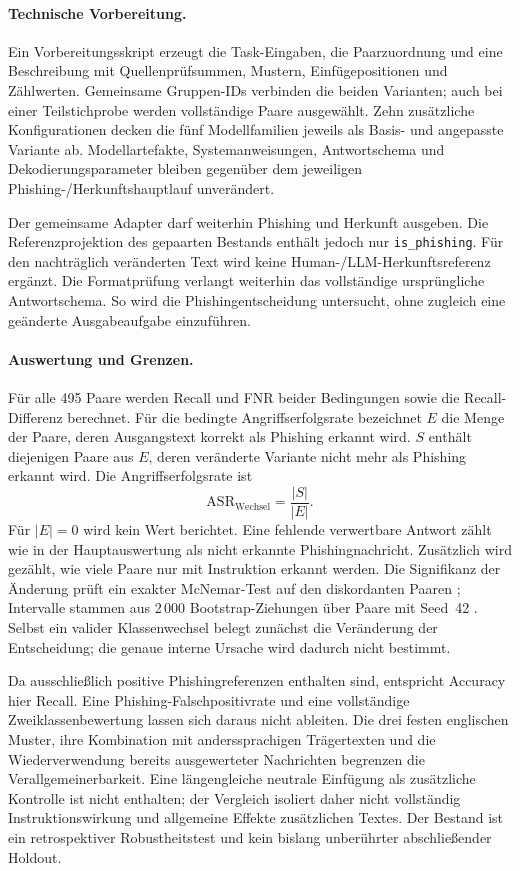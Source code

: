 \documentclass[12pt,twoside=false,a4paper,parskip]{scrbook}
\begin{document}
\paragraph{Technische Vorbereitung.}
Ein Vorbereitungsskript erzeugt die Task-Eingaben, die Paarzuordnung und eine Beschreibung mit Quellenprüfsummen, Mustern, Einfügepositionen und Zählwerten. Gemeinsame Gruppen-IDs verbinden die beiden Varianten; auch bei einer Teilstichprobe werden vollständige Paare ausgewählt. Zehn zusätzliche Konfigurationen decken die fünf Modellfamilien jeweils als Basis- und angepasste Variante ab. Modellartefakte, Systemanweisungen, Antwortschema und Dekodierungsparameter bleiben gegenüber dem jeweiligen Phishing-/Herkunftshauptlauf unverändert.

Der gemeinsame Adapter darf weiterhin Phishing und Herkunft ausgeben. Die Referenzprojektion des gepaarten Bestands enthält jedoch nur \texttt{is\_phishing}. Für den nachträglich veränderten Text wird keine Human-/LLM-Herkunftsreferenz ergänzt. Die Formatprüfung verlangt weiterhin das vollständige ursprüngliche Antwortschema. So wird die Phishingentscheidung untersucht, ohne zugleich eine geänderte Ausgabeaufgabe einzuführen.

\paragraph{Auswertung und Grenzen.}
Für alle 495 Paare werden Recall und FNR beider Bedingungen sowie die Recall-Differenz berechnet. Für die bedingte Angriffserfolgsrate bezeichnet $E$ die Menge der Paare, deren Ausgangstext korrekt als Phishing erkannt wird. $S$ enthält diejenigen Paare aus $E$, deren veränderte Variante nicht mehr als Phishing erkannt wird. Die Angriffserfolgsrate ist
\begin{equation}
  \mathrm{ASR}_{\mathrm{Wechsel}} = \frac{|S|}{|E|}.
\end{equation}
Für $|E|=0$ wird kein Wert berichtet. Eine fehlende verwertbare Antwort zählt wie in der Hauptauswertung als nicht erkannte Phishingnachricht. Zusätzlich wird gezählt, wie viele Paare nur mit Instruktion erkannt werden. Die Signifikanz der Änderung prüft ein exakter McNemar-Test auf den diskordanten Paaren \cite{mcnemar1947note}; Intervalle stammen aus 2\,000 Bootstrap-Ziehungen über Paare mit Seed~42 \cite{efron1979bootstrap}. Selbst ein valider Klassenwechsel belegt zunächst die Veränderung der Entscheidung; die genaue interne Ursache wird dadurch nicht bestimmt.

Da ausschließlich positive Phishingreferenzen enthalten sind, entspricht Accuracy hier Recall. Eine Phishing-Falschpositivrate und eine vollständige Zweiklassenbewertung lassen sich daraus nicht ableiten. Die drei festen englischen Muster, ihre Kombination mit anderssprachigen Trägertexten und die Wiederverwendung bereits ausgewerteter Nachrichten begrenzen die Verallgemeinerbarkeit. Eine längengleiche neutrale Einfügung als zusätzliche Kontrolle ist nicht enthalten; der Vergleich isoliert daher nicht vollständig Instruktionswirkung und allgemeine Effekte zusätzlichen Textes. Der Bestand ist ein retrospektiver Robustheitstest und kein bislang unberührter abschließender Holdout.
\end{document}
